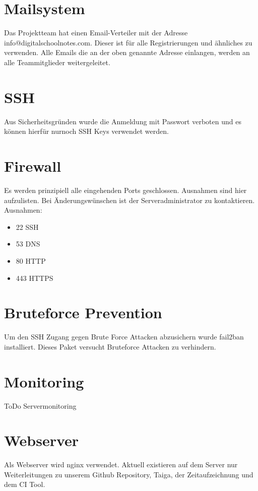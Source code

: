 \documentclass[12pt,a4paper,oneside,ngerman]{scrartcl}
\begin{document}
\section{Mailsystem}
Das Projektteam hat einen Email-Verteiler mit der Adresse info@digitalschoolnotes.com. Dieser ist für alle Registrierungen und ähnliches zu verwenden. Alle Emails die an der oben genannte Adresse einlangen, werden an alle Teammitglieder weitergeleitet.

\section{SSH}
Aus Sicherheitsgründen wurde die Anmeldung mit Passwort verboten und es können hierfür nurnoch SSH Keys verwendet werden.

\section{Firewall}
Es werden prinzipiell alle eingehenden Ports geschlossen. Ausnahmen sind hier aufzulisten. Bei Änderungswünschen ist der Serveradministrator zu kontaktieren.\\

Ausnahmen:
\begin{itemize}
\item 22	SSH
\item 53	DNS
\item 80	HTTP
\item 443	HTTPS
\end{itemize}
\section{Bruteforce Prevention}
Um den SSH Zugang gegen Brute Force Attacken abzusichern wurde fail2ban installiert. Dieses Paket versucht Bruteforce Attacken zu verhindern. \cite{HOWTO:1}

\section{Monitoring}
ToDo Servermonitoring

\section{Webserver}
Als Webserver wird nginx verwendet. Aktuell existieren auf dem Server nur Weiterleitungen zu unserem Github Repository, Taiga, der Zeitaufzeichnung und dem CI Tool.


 



\end{document}
